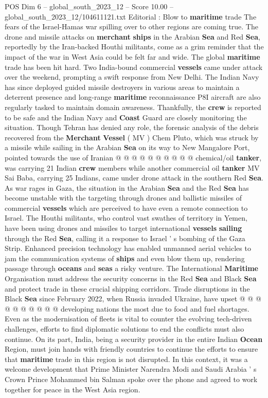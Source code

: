 \begin{textsample}{POS Dim 6 – global\_south\_2023\_12 – Score 10.00 – global\_south\_2023\_12/104611121.txt}  \label{ex:f6_pos_104}
Editorial : Blow to \textbf{maritime} trade The fears of the Israel-Hamas war spilling over to other regions are coming true.
The drone and missile attacks on \textbf{merchant} \textbf{ships} in the Arabian \textbf{Sea} and Red \textbf{Sea}, reportedly by the Iran-backed Houthi militants, come as a grim reminder that the impact of the war in West Asia could be felt far and wide.
The global \textbf{maritime} trade has been hit hard.
Two India-bound commercial \textbf{vessels} came under attack over the weekend, prompting a swift response from New Delhi.
The Indian Navy has since deployed guided missile destroyers in various areas to maintain a deterrent presence and long-range \textbf{maritime} reconnaissance P8I aircraft are also regularly tasked to maintain domain awareness.
Thankfully, the \textbf{crew} is reported to be safe and the Indian Navy and \textbf{Coast} Guard are closely monitoring the situation.
Though Tehran has denied any role, the forensic analysis of the debris recovered from the \textbf{Merchant} \textbf{Vessel} ( MV ) Chem Pluto, which was struck by a missile while sailing in the Arabian \textbf{Sea} on its way to New Mangalore Port, pointed towards the use of Iranian @ @ @ @ @ @ @ @ @ @ chemical/oil \textbf{tanker}, was carrying 21 Indian \textbf{crew} members while another commercial oil \textbf{tanker} MV Sai Baba, carrying 25 Indians, came under drone attack in the southern Red \textbf{Sea}.
As war rages in Gaza, the situation in the Arabian \textbf{Sea} and the Red \textbf{Sea} has become unstable with the targeting through drones and ballistic missiles of commercial \textbf{vessels} which are perceived to have even a remote connection to Israel.
The Houthi militants, who control vast swathes of territory in Yemen, have been using drones and missiles to target international \textbf{vessels} \textbf{sailing} through the Red \textbf{Sea}, calling it a response to Israel ' s bombing of the Gaza Strip.
Enhanced precision technology has enabled unmanned aerial vehicles to jam the communication systems of \textbf{ships} and even blow them up, rendering passage through \textbf{oceans} and \textbf{seas} a risky venture.
The International \textbf{Maritime} Organisation must address the security concerns in the Red \textbf{Sea} and Black \textbf{Sea} and protect trade in these crucial shipping corridors.
Trade disruptions in the Black \textbf{Sea} since February 2022, when Russia invaded Ukraine, have upset @ @ @ @ @ @ @ @ @ @ developing nations the most due to food and fuel shortages.
Even as the modernisation of fleets is vital to counter the evolving tech-driven challenges, efforts to find diplomatic solutions to end the conflicts must also continue.
On its part, India, being a security provider in the entire Indian \textbf{Ocean} Region, must join hands with friendly countries to continue the efforts to ensure that \textbf{maritime} trade in this region is not disrupted.
In this context, it was a welcome development that Prime Minister Narendra Modi and Saudi Arabia ' s Crown Prince Mohammed bin Salman spoke over the phone and agreed to work together for peace in the West Asia region.


\end{textsample}
